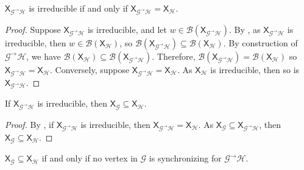 \documentclass[hidelinks]{report}
\newcommand{\Gc}{\mathcal{G}}  %
\newcommand{\Hc}{\mathcal{H}}  %
\newcommand{\Bc}{\mathcal{B}}
\newcommand{\GtH}{{\Gc^\to\Hc}}
\newcommand{\shift}[1]{\mathsf{X}_{#1}}
\theoremstyle{definition}
\begin{document}
\begin{theorem}\label{irreq}
    \(\shift{\GtH}\) is irreducible if and only if \(\shift{\GtH} = \shift{\Hc}\).
\end{theorem}

\begin{proof}
    Suppose \(\shift{\GtH}\) is irreducible, and let \(w \in \Bc(\shift{\GtH})\). By , 
    as \(\shift{\GtH}\) is irreducible, then \(w \in \Bc(\shift{\Hc})\), so \(\Bc(\shift{\GtH}) \subseteq \Bc(\shift{\Hc})\).
    By construction of \(\GtH\), we have \(\Bc(\shift{\Hc}) \subseteq \Bc(\shift{\GtH})\). Therefore, 
    \(\Bc(\shift{\GtH}) = \Bc(\shift{\Hc})\) so \(\shift{\GtH} = \shift{\Hc}\).
    Conversely, suppose \(\shift{\GtH} = \shift{\Hc}\). As \(\shift{\Hc}\) is irreducible, then so 
    is \(\shift{\GtH}\).
\end{proof}

\begin{corollary}\label{irrsubshift}
    If \(\shift{\GtH}\) is irreducible, then \(\shift{\Gc} \subseteq \shift{\Hc}\).
\end{corollary}

\begin{proof}
    By , if \(\shift{\GtH}\) is irreducible, then \(\shift{\GtH} = \shift{\Hc}\).
    As \(\shift{\Gc} \subseteq \shift{\GtH}\), then \(\shift{\Gc} \subseteq \shift{\Hc}\).
\end{proof}

\begin{theorem}\label{subshiftsyncequiv}
    \(\shift{\Gc} \subseteq \shift{\Hc}\) if and only if no vertex in \(\Gc\) is synchronizing for 
    \(\GtH\).
\end{theorem}
\end{document}
